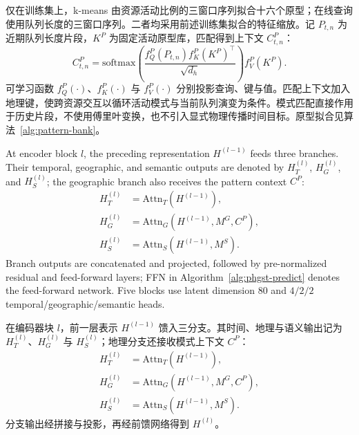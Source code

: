 \documentclass[a4paper,fleqn]{cas-dc}
\newcommand{\zhpara}[1]{%
  \par\begingroup\small\color{black!72}\noindent #1\par\endgroup}
\begin{document}
\zhpara{仅在训练集上，k-means 由资源活动比例的三窗口序列拟合十六个原型；在线查询使用队列长度的三窗口序列。二者均采用前述训练集拟合的特征缩放。记 $P_{t,n}$ 为近期队列长度片段，$K^P$ 为固定活动原型库，匹配得到上下文 $C^P_{t,n}$：
\begin{equation}
C^P_{t,n}=
\mathrm{softmax}\!\left(
\frac{f_Q^P(P_{t,n})f_K^P(K^P)^\top}{\sqrt{d_h}}
\right)f_V^P(K^P).
\end{equation}
可学习函数 $f_Q^P(\cdot)$、$f_K^P(\cdot)$ 与 $f_V^P(\cdot)$ 分别投影查询、键与值。匹配上下文加入地理键，使跨资源交互以循环活动模式与当前队列演变为条件。模式匹配直接作用于历史片段，不使用傅里叶变换，也不引入显式物理传播时间目标。原型拟合见算法~\ref{alg:pattern-bank}。}


At encoder block $l$, the preceding representation $H^{(l-1)}$ feeds three branches. Their temporal, geographic, and semantic outputs are denoted by $H_T^{(l)}$, $H_G^{(l)}$, and $H_S^{(l)}$; the geographic branch also receives the pattern context $C^P$:
\begin{equation}
\begin{aligned}
H_T^{(l)}&=\mathrm{Attn}_T(H^{(l-1)}),\\
H_G^{(l)}&=\mathrm{Attn}_G(H^{(l-1)},M^G,C^P),\\
H_S^{(l)}&=\mathrm{Attn}_S(H^{(l-1)},M^S).
\end{aligned}
\end{equation}
Branch outputs are concatenated and projected, followed by pre-normalized residual and feed-forward layers; FFN in Algorithm~\ref{alg:phgst-predict} denotes the feed-forward network. Five blocks use latent dimension 80 and $4/2/2$ temporal/geographic/semantic heads.

\zhpara{在编码器块 $l$，前一层表示 $H^{(l-1)}$ 馈入三分支。其时间、地理与语义输出记为 $H_T^{(l)}$、$H_G^{(l)}$ 与 $H_S^{(l)}$；地理分支还接收模式上下文 $C^P$：
\begin{equation}
\begin{aligned}
H_T^{(l)}&=\mathrm{Attn}_T(H^{(l-1)}),\\
H_G^{(l)}&=\mathrm{Attn}_G(H^{(l-1)},M^G,C^P),\\
H_S^{(l)}&=\mathrm{Attn}_S(H^{(l-1)},M^S).
\end{aligned}
\end{equation}
分支输出经拼接与投影，再经前馈网络得到 $H^{(l)}$。}
\end{document}
